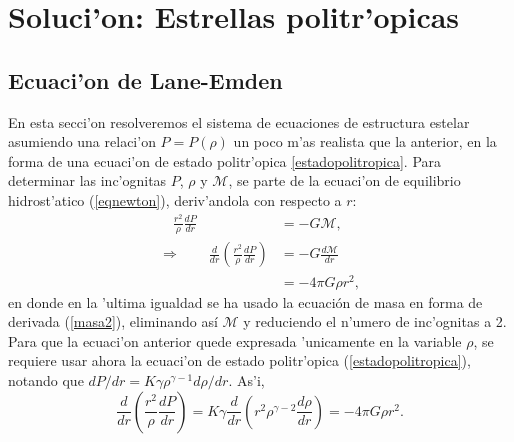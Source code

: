 \section{Soluci'on: Estrellas politr'opicas}
\subsection{Ecuaci'on de Lane-Emden}
En esta secci'on resolveremos el sistema de ecuaciones de estructura estelar asumiendo una relaci'on $P=P(\rho)$ un poco m'as realista que la anterior, en la forma de una ecuaci'on de estado politr'opica \eqref{estadopolitropica}. Para determinar las inc'ognitas $P$, $\rho$ y $\mathcal{M}$, se parte de la ecuaci'on de equilibrio hidrost'atico (\ref{eqnewton}), deriv'andola con respecto a $r$:
\begin{align}
\quad\frac{r^2}{\rho}\frac{dP}{dr}&=-G\mathcal{M},\quad\\
\Rightarrow\qquad\frac{d}{dr}\left(\frac{r^2}{\rho}\frac{dP}{dr}\right)&=-G\frac{d\mathcal{M}}{dr}\\
&=-4\pi G\rho r^2,\label{eq-hidrostatico-sinm}
\end{align}
en donde en la 'ultima igualdad se ha usado la ecuaci\'on de masa en forma de derivada (\ref{masa2}), eliminando as\'i $\mathcal{M}$ y reduciendo el n'umero de inc'ognitas a 2. Para que la ecuaci'on anterior quede expresada 'unicamente en la variable $\rho$, se requiere usar ahora la ecuaci'on de estado politr'opica (\ref{estadopolitropica}), notando que ${dP}/{dr}=K\gamma\rho^{\gamma-1}d\rho/dr$. As'i,
\begin{equation}\label{laneprevia}
 \frac{d}{dr}\left(\frac{r^2}{\rho}\frac{dP}{dr}\right)=K\gamma\frac{d}{dr}\left(r^2\rho^{\gamma-2}\frac{d\rho}{dr}\right)=-4\pi G\rho r^2.
\end{equation}

